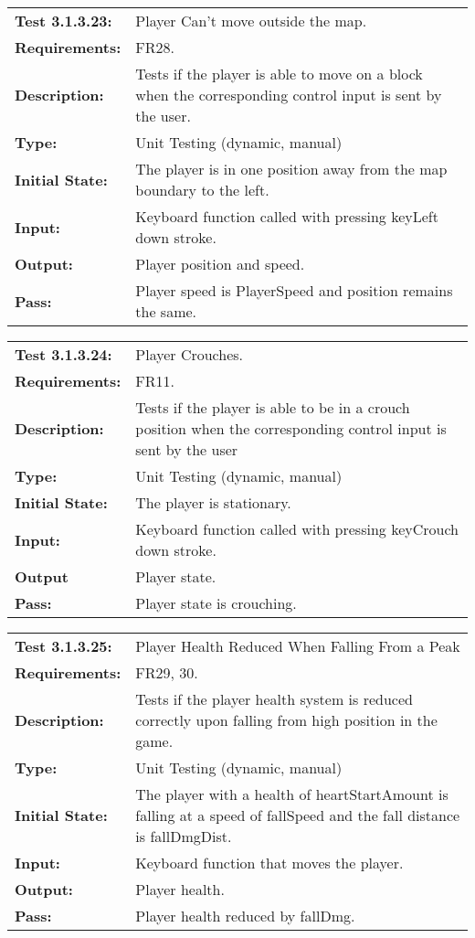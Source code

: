 \documentclass[12pt, titlepage]{article}
\begin{document}
\begin{tabular}{|l|p{10cm}|}
    \hline
    \bf{Test} 3.1.3.23: &  Player Can't move outside the map.\\
    \bf{Requirements}: & FR28.\\
    \bf{Description}: & Tests if the player is able to move on a block when the corresponding control input is sent by the user. \\
    \bf{Type}: & Unit Testing (dynamic, manual) \\
    \bf{Initial State}: & The player is in one position away from the map boundary to the left. \\
    \bf{Input}: & Keyboard function called with pressing keyLeft down stroke.\\
    \bf{Output}: & Player position and speed.\\
    \bf{Pass}: & Player speed is PlayerSpeed and position remains the same.\\
    \hline
\end{tabular}

\begin{tabular}{|l|p{10cm}|}
    \hline
    \bf{Test} 3.1.3.24: & Player Crouches.\\
    \bf{Requirements}: & FR11. \\
    \bf{Description}: & Tests if the player is able to be in a crouch position when the corresponding control input is sent by the user \\
    \bf{Type}: & Unit Testing (dynamic, manual) \\
    \bf{Initial State}: & The player is stationary. \\
    \bf{Input}: & Keyboard function called with pressing keyCrouch down stroke. \\
    \bf{Output} & Player state.\\
    \bf{Pass}: & Player state is crouching.\\
    \hline
\end{tabular}

\begin{tabular}{|l|p{10cm}|}
    \hline
    \bf{Test} 3.1.3.25: & Player Health Reduced When Falling From a Peak \\
    \bf{Requirements}: & FR29, 30. \\
    \bf{Description}: & Tests if the player health system is reduced correctly upon falling from high position in the game.\\
    \bf{Type}: & Unit Testing (dynamic, manual) \\
    \bf{Initial State}: & The player with a health of heartStartAmount is falling at a speed of fallSpeed and the fall distance is fallDmgDist. \\
    \bf{Input}: & Keyboard function that moves the player.\\
    \bf{Output}: & Player health.\\
    \bf{Pass}: & Player health reduced by fallDmg.\\
    \hline
\end{tabular}
\end{document}

